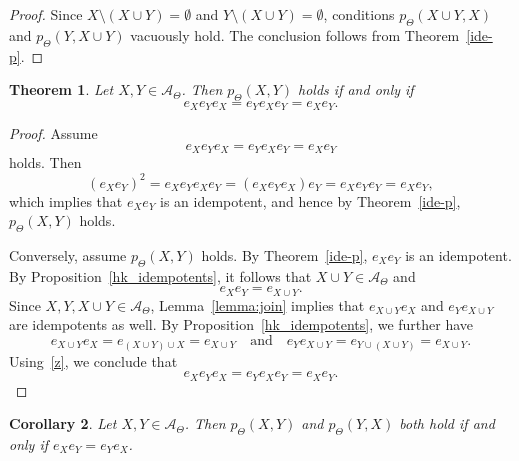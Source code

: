 \documentclass[pdflatex,sn-mathphys-num]{sn-jnl}
\newtheorem{theorem}{Theorem}[section]
\newtheorem{corollary}[theorem]{Corollary}
\theoremstyle{definition}
\theoremstyle{remark}
\begin{document}
\begin{proof}
   Since $X \setminus (X \cup Y) = \emptyset$ and $Y \setminus (X \cup Y) = \emptyset$, conditions $p_{\Theta}(X \cup Y, X)$ and $p_{\Theta}(Y, X \cup Y)$ vacuously hold.
   The conclusion follows from Theorem~\ref{ide-p}.
\end{proof}

\begin{theorem}\label{theorem:p}
   Let $X, Y \in \mathcal{A}_{\Theta}$.
   Then $p_{\Theta}(X, Y)$ holds if and only if
   \[
   e_X e_Y e_X = e_Y e_X e_Y = e_X e_Y.
   \]
\end{theorem}

\begin{proof}
   Assume
   \[
   e_X e_Y e_X = e_Y e_X e_Y = e_X e_Y
   \]
   holds.
   Then 
   \[
   (e_X e_Y)^2 = e_X e_Y e_X e_Y = (e_X e_Y e_X) e_Y = e_X e_Y e_Y = e_X e_Y,
   \]
   which implies that $e_X e_Y$ is an idempotent, and hence by Theorem~\ref{ide-p}, $p_{\Theta}(X, Y)$ holds.

   Conversely, assume $p_{\Theta}(X, Y)$ holds.
   By Theorem~\ref{ide-p}, $e_X e_Y$ is an idempotent.
   By Proposition~\ref{hk_idempotents}, it follows that $X \cup Y \in \mathcal{A}_{\Theta}$ and 
   \begin{equation}\label{z}
      e_X e_Y = e_{X \cup Y}.
   \end{equation}
   Since $X, Y, X \cup Y \in \mathcal{A}_{\Theta}$, Lemma~\ref{lemma:join} implies that $e_{X \cup Y} e_X$ and $e_Y e_{X \cup Y}$ are idempotents as well.
   By Proposition~\ref{hk_idempotents}, we further have
   \[
   e_{X \cup Y} e_X = e_{(X \cup Y) \cup X} = e_{X \cup Y} \quad \text{and} \quad e_Y e_{X \cup Y} = e_{Y \cup (X \cup Y)} = e_{X \cup Y}.
   \]
   Using~\eqref{z}, we conclude that 
   \[
   e_X e_Y e_X = e_Y e_X e_Y = e_X e_Y.
   \]
\end{proof}

\begin{corollary}\label{cor:p}
   Let $X, Y \in \mathcal{A}_{\Theta}$.
   Then $p_{\Theta}(X, Y)$ and $p_{\Theta}(Y, X)$ both hold if and only if $e_X e_Y = e_Y e_X$.
\end{corollary}
\end{document}
